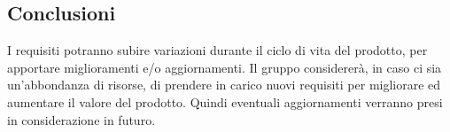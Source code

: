 	\subsection{Conclusioni}
		I requisiti potranno subire variazioni durante il ciclo di vita del prodotto, per apportare miglioramenti e/o aggiornamenti. Il gruppo considererà, in caso ci sia un'abbondanza di risorse, di prendere in carico nuovi requisiti per migliorare ed aumentare il valore del prodotto.
		Quindi eventuali aggiornamenti verranno presi in considerazione in futuro.
